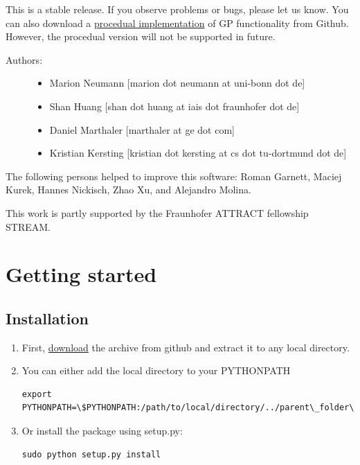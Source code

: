 \documentclass[letterpaper,10pt,english]{sphinxmanual}
\begin{document}
This is a stable release. If you observe problems or bugs, please let us know.
You can also download a \href{https://github.com/marionmari/pyGP\_PR/}{procedual implementation} of GP functionality from Github. However, the procedual version will not be supported in future.
\begin{description}
\item[{Authors:}] \leavevmode\begin{itemize}
\item {} 
Marion Neumann {[}marion dot neumann at uni-bonn dot de{]}

\item {} 
Shan Huang {[}shan dot huang at iais dot fraunhofer dot de{]}

\item {} 
Daniel Marthaler {[}marthaler at ge dot com{]}

\item {} 
Kristian Kersting {[}kristian dot kersting at cs dot tu-dortmund dot de{]}

\end{itemize}

\end{description}

The following persons helped to improve this software: Roman Garnett, Maciej Kurek, Hannes Nickisch, Zhao Xu, and Alejandro Molina.

This work is partly supported by the Fraunhofer ATTRACT fellowship STREAM.


\section{Getting started}
\label{index:getting-started}

\subsection{Installation}
\label{Install:installation}\label{Install::doc}\begin{enumerate}
\item {} 
First, \href{https://github.com/marionmari/pyGPs/releases/tag/v1.1}{download} the archive from github and extract it to any local directory.

\end{enumerate}
\begin{enumerate}
\setcounter{enumi}{1}
\item {} 
You can either add the local directory to your PYTHONPATH

\begin{Verbatim}[commandchars=\\\{\}]
export PYTHONPATH=\$PYTHONPATH:/path/to/local/directory/../parent\_folder\_of\_pyGPs
\end{Verbatim}

\item {} 
Or install the package using setup.py:

\begin{Verbatim}[commandchars=\\\{\}]
sudo python setup.py install
\end{Verbatim}

\end{enumerate}
\end{document}
